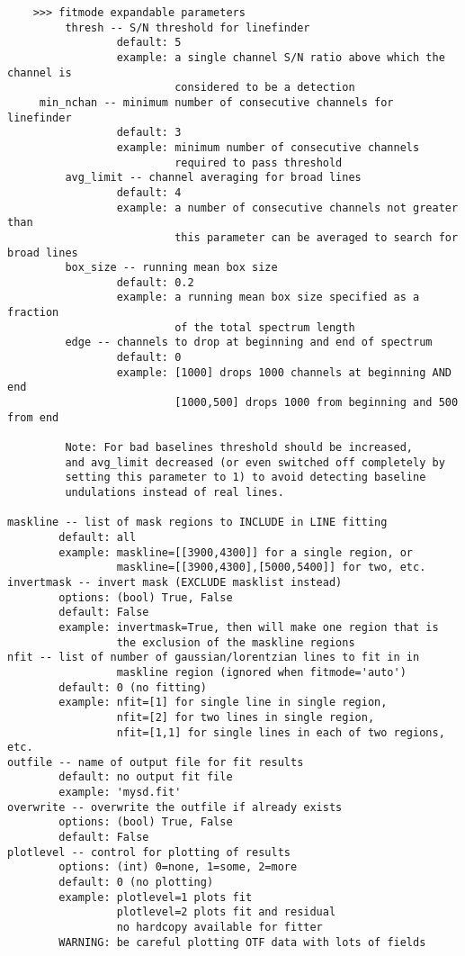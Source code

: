 \begin{verbatim}
    >>> fitmode expandable parameters             
         thresh -- S/N threshold for linefinder
                 default: 5
                 example: a single channel S/N ratio above which the channel is
                          considered to be a detection
	 min_nchan -- minimum number of consecutive channels for linefinder
       	         default: 3
                 example: minimum number of consecutive channels
                          required to pass threshold
         avg_limit -- channel averaging for broad lines
                 default: 4
                 example: a number of consecutive channels not greater than
                          this parameter can be averaged to search for broad lines
         box_size -- running mean box size
                 default: 0.2
                 example: a running mean box size specified as a fraction
                          of the total spectrum length
         edge -- channels to drop at beginning and end of spectrum
                 default: 0
                 example: [1000] drops 1000 channels at beginning AND end
                          [1000,500] drops 1000 from beginning and 500 from end

         Note: For bad baselines threshold should be increased,
         and avg_limit decreased (or even switched off completely by
         setting this parameter to 1) to avoid detecting baseline
         undulations instead of real lines.

maskline -- list of mask regions to INCLUDE in LINE fitting
        default: all
        example: maskline=[[3900,4300]] for a single region, or
                 maskline=[[3900,4300],[5000,5400]] for two, etc.
invertmask -- invert mask (EXCLUDE masklist instead)
        options: (bool) True, False
        default: False
        example: invertmask=True, then will make one region that is
                 the exclusion of the maskline regions
nfit -- list of number of gaussian/lorentzian lines to fit in in
                 maskline region (ignored when fitmode='auto')
        default: 0 (no fitting)
        example: nfit=[1] for single line in single region,
                 nfit=[2] for two lines in single region,
                 nfit=[1,1] for single lines in each of two regions, etc.
outfile -- name of output file for fit results
        default: no output fit file
        example: 'mysd.fit'
overwrite -- overwrite the outfile if already exists
        options: (bool) True, False
        default: False
plotlevel -- control for plotting of results
        options: (int) 0=none, 1=some, 2=more
        default: 0 (no plotting)
        example: plotlevel=1 plots fit
                 plotlevel=2 plots fit and residual 
                 no hardcopy available for fitter
        WARNING: be careful plotting OTF data with lots of fields


\end{verbatim}
